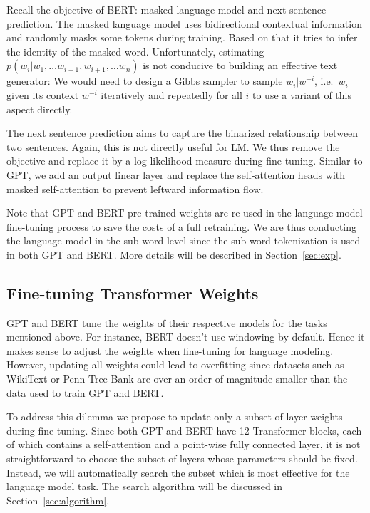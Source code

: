 \documentclass[11pt,a4paper]{article}
\begin{document}
Recall the objective of BERT: masked language model and next sentence prediction. The masked language model uses bidirectional contextual information and randomly masks some tokens during training. Based on that it tries to infer the identity of the masked word. Unfortunately, estimating $p(w_i|w_1, \ldots w_{i-1}, w_{i+1}, \ldots w_n)$ is not conducive to building an effective text generator: We would need to design a Gibbs sampler to sample $w_i|w^{-i}$, i.e.\ $w_i$ given its context $w^{-i}$ iteratively and repeatedly for all $i$ to use a variant of this aspect directly. 

The next sentence prediction aims to capture the binarized relationship between two sentences. Again, this is not directly useful for LM. We thus remove the objective and replace it by a log-likelihood measure during fine-tuning. Similar to GPT, we add an output linear layer and replace the self-attention heads with masked self-attention to prevent leftward information flow.

Note that GPT and BERT pre-trained weights are re-used in the language model fine-tuning process to save the costs of a full retraining. We are thus conducting the language model in the sub-word level since the sub-word tokenization is used in both GPT and BERT. More details will be described in Section~\ref{sec:exp}. 

\subsection{Fine-tuning Transformer Weights}

GPT and BERT tune the weights of their respective models for the tasks
mentioned above. For instance, BERT doesn't use windowing by
default. Hence it makes sense to adjust the weights when fine-tuning
for language modeling. However, updating all weights could lead to
overfitting since datasets such as WikiText or Penn Tree Bank are over
an order of magnitude smaller than the data used to train GPT and
BERT.

To address this dilemma we propose to update only a subset of layer
weights during fine-tuning. Since both GPT and BERT have 12
Transformer blocks, each of which contains a self-attention and a
point-wise fully connected layer, it is not straightforward to choose
the subset of layers whose parameters should be fixed. Instead, we
will automatically search the subset which is most effective for the
language model task. The search algorithm will be discussed in
Section~\ref{sec:algorithm}.
\end{document}
